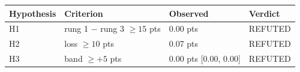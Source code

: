 \begin{tabular}{p{3.2cm}p{4.2cm}p{5.2cm}p{2.6cm}}
\hline
Hypothesis & Criterion & Observed & Verdict \\
\hline
H1 & rung 1 $- $ rung 3 $\ge 15$ pts & 0.00 pts & REFUTED \\
H2 & loss $\ge 10$ pts & 0.07 pts & REFUTED \\
H3 & band $\ge +5$ pts & 0.00 pts [0.00, 0.00] & REFUTED \\
\hline
\end{tabular}
